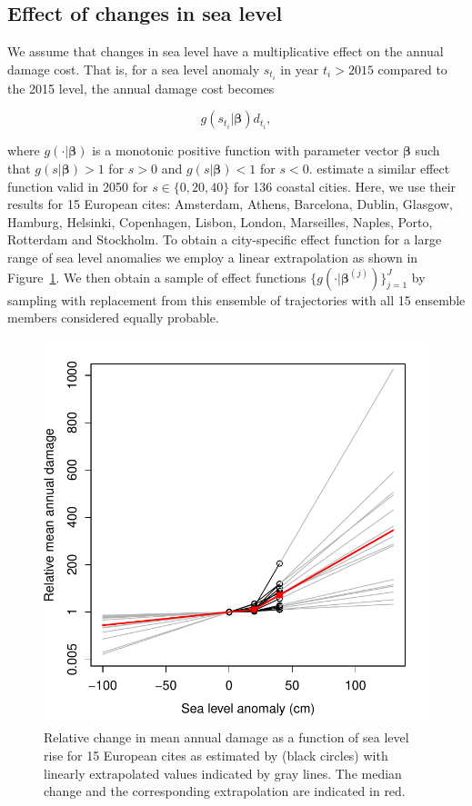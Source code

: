 \documentclass[draft,linenumbers]{agujournal}
\begin{document}
\subsection{Effect of changes in sea level}

We assume that changes in sea level have a multiplicative effect on the annual damage cost. That is, for a sea level anomaly $s_{t_i}$ in year $t_i > 2015$ compared to the 2015 level, the annual damage cost becomes
\begin{linenomath*}
  \[
  g(s_{t_i} | \boldsymbol \beta ) d_{t_i},
  \]
\end{linenomath*}
where $g( \cdot | \boldsymbol \beta )$ is a monotonic positive function with parameter vector  $\boldsymbol \beta$ such that $g(s|\boldsymbol \beta ) > 1$ for $s>0$ and $g(s|\boldsymbol \beta ) < 1$ for $s < 0$. \cite{Hallegatte&2013} estimate a similar effect function valid in 2050 for $s \in \{0,20,40\}$ for 136 coastal cities. Here, we use their results for 15 European cites: Amsterdam, Athens, Barcelona, Dublin, Glasgow, Hamburg, Helsinki, Copenhagen, Lisbon, London, Marseilles, Naples, Porto, Rotterdam and Stockholm.  To obtain a city-specific effect function for a large range of sea level anomalies we employ a linear extrapolation as shown in Figure~\ref{fig:EffectFct}. We then obtain a sample of effect functions $\{g(\cdot|\boldsymbol \beta^{(j)})\}_{j=1}^J$ by sampling with replacement from this ensemble of trajectories with all 15 ensemble members considered equally probable. 

\begin{figure}[!hbpt]
\begin{center}
\includegraphics[width=0.5\linewidth]{DecisionAnalysisBergenPartII.pdf}
\caption{Relative change in mean annual damage as a function of sea level rise for 15 European cites as estimated by \cite{Hallegatte&2013} (black circles) with linearly extrapolated values indicated by gray lines. The median change and the corresponding extrapolation are indicated in red.}
\label{fig:EffectFct}
\end{center}
\end{figure}
\end{document}
